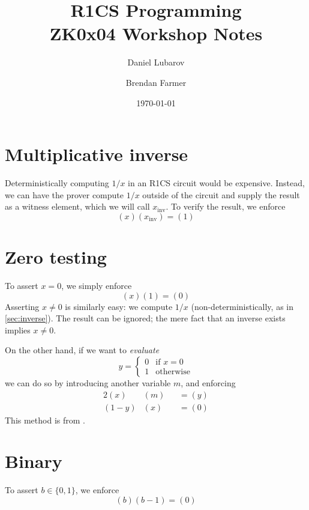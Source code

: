 \documentclass{article}
\title{R1CS Programming \\ \large ZK0x04 Workshop Notes}
\author{Daniel Lubarov \and Brendan Farmer}
\date{\today}
\begin{document}
\maketitle

{\hypersetup{hidelinks} \tableofcontents}
\newpage


\section{Multiplicative inverse} \label{sec:inverse}

Deterministically computing $1 / x$ in an R1CS circuit would be expensive. Instead, we can have the prover compute $1 / x$ outside of the circuit and supply the result as a witness element, which we will call $x_\mathrm{inv}$. To verify the result, we enforce
\begin{equation}
  (x) (x_\mathrm{inv}) = (1)
\end{equation}


\section{Zero testing}

To assert $x = 0$, we simply enforce
\begin{equation}
  (x) (1) = (0)
\end{equation}
Asserting $x \ne 0$ is similarly easy: we compute $1 / x$ (non-deterministically, as in \autoref{sec:inverse}). The result can be ignored; the mere fact that an inverse exists implies $x \ne 0$.

On the other hand, if we want to \textit{evaluate}
\begin{equation}
  y =
  \begin{cases}
    0 & \text{if $x = 0$} \\
    1 & \text{otherwise}
  \end{cases}
\end{equation}
we can do so by introducing another variable $m$, and enforcing
\begin{alignat}{2}
  (x)     & (m) &&= (y) \\
  (1 - y) & (x) &&= (0)
\end{alignat}
This method is from \cite{parno2013pinocchio}.


\section{Binary}

To assert $b \in \{ 0, 1 \}$, we enforce
\begin{equation}
  (b) (b - 1) = (0)
\end{equation}
\end{document}
